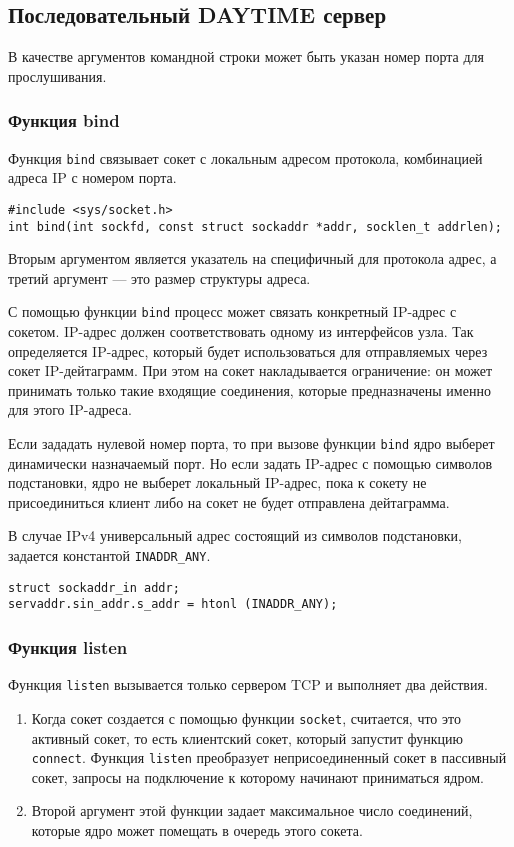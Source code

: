 \subsection{Последовательный DAYTIME сервер}
В качестве аргументов командной строки может быть указан номер порта для прослушивания.

\lstset{label=lst:date-server,caption=DAYTIME сервер}


\subsubsection{Функция bind}
Функция \lstinline{bind} связывает сокет с локальным адресом протокола, комбинацией адреса IP с номером порта.
\lstset{language=C,caption=}
\begin{lstlisting}
#include <sys/socket.h>
int bind(int sockfd, const struct sockaddr *addr, socklen_t addrlen);
\end{lstlisting}

Вторым аргументом является указатель на специфичный для протокола адрес, а третий аргумент --- это размер структуры адреса.

С помощью функции \lstinline{bind} процесс может связать конкретный IP-адрес с сокетом. IP-адрес должен соответствовать одному из интерфейсов узла. Так определяется IP-адрес, который будет использоваться для отправляемых через сокет IP-дейтаграмм. При этом на сокет накладывается ограничение: он может принимать только такие входящие соединения, которые предназначены именно для этого IP-адреса.

Если зададать нулевой номер порта, то при вызове функции \lstinline{bind} ядро выберет динамически назначаемый порт. Но если задать IP-адрес с помощью символов подстановки, ядро не выберет локальный IP-адрес, пока к сокету не присоединиться клиент либо на сокет не будет отправлена дейтаграмма.

В случае IPv4 универсальный адрес состоящий из символов подстановки, задается константой \lstinline{INADDR_ANY}.
\lstset{language=C,caption=}
\begin{lstlisting}
struct sockaddr_in addr;
servaddr.sin_addr.s_addr = htonl (INADDR_ANY);
\end{lstlisting}

\subsubsection{Функция listen}
Функция \lstinline{listen} вызывается только сервером TCP и выполняет два действия.
\begin{enumerate}
  \item Когда сокет создается с помощью функции \lstinline{socket}, считается, что это активный сокет, то есть клиентский сокет, который запустит функцию \lstinline{connect}. Функция \lstinline{listen} преобразует неприсоединенный сокет в пассивный сокет, запросы на подключение к которому начинают приниматься ядром.
  \item Второй аргумент этой функции задает максимальное число соединений, которые ядро может помещать в очередь этого сокета.
\end{enumerate}

